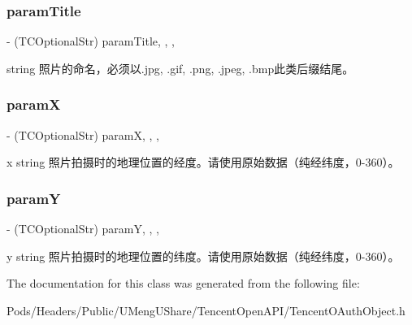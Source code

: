 \subsubsection{\texorpdfstring{param\+Title}{paramTitle}}
{\footnotesize\ttfamily -\/ (T\+C\+Optional\+Str) param\+Title\hspace{0.3cm}{\ttfamily [read]}, {\ttfamily [write]}, {\ttfamily [nonatomic]}, {\ttfamily [retain]}}

string 照片的命名，必须以.\+jpg, .gif, .png, .jpeg, .bmp此类后缀结尾。 \mbox{\label{interface_t_c_upload_pic_dic_a0f89477a04d39340c7a77aa5133460bf}} 
\subsubsection{\texorpdfstring{paramX}{paramX}}
{\footnotesize\ttfamily -\/ (T\+C\+Optional\+Str) paramX\hspace{0.3cm}{\ttfamily [read]}, {\ttfamily [write]}, {\ttfamily [nonatomic]}, {\ttfamily [retain]}}

x string 照片拍摄时的地理位置的经度。请使用原始数据（纯经纬度，0-\/360）。 \mbox{\label{interface_t_c_upload_pic_dic_a603ec77f19613b735e5bb7a360858130}} 
\subsubsection{\texorpdfstring{paramY}{paramY}}
{\footnotesize\ttfamily -\/ (T\+C\+Optional\+Str) paramY\hspace{0.3cm}{\ttfamily [read]}, {\ttfamily [write]}, {\ttfamily [nonatomic]}, {\ttfamily [retain]}}

y string 照片拍摄时的地理位置的纬度。请使用原始数据（纯经纬度，0-\/360）。 

The documentation for this class was generated from the following file\+:\begin{DoxyCompactItemize}
\item 
Pods/\+Headers/\+Public/\+U\+Meng\+U\+Share/\+Tencent\+Open\+A\+P\+I/Tencent\+O\+Auth\+Object.\+h\end{DoxyCompactItemize}
